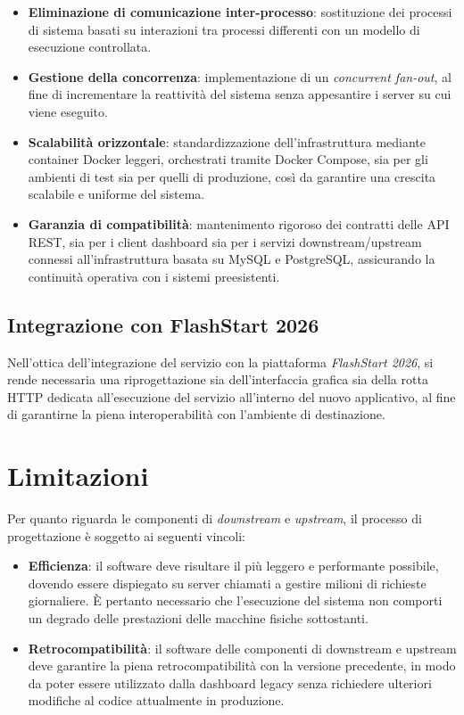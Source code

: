 \begin{itemize}
    \item \textbf{Eliminazione di comunicazione inter-processo}: sostituzione dei processi di sistema basati su interazioni tra processi differenti con un modello di esecuzione controllata.
    
    \item \textbf{Gestione della concorrenza}: implementazione di un \emph{concurrent fan-out}, al fine di incrementare la reattività del sistema senza appesantire i server su cui viene eseguito.

    \item \textbf{Scalabilità orizzontale}: standardizzazione dell'infrastruttura mediante container Docker leggeri, orchestrati tramite Docker Compose, sia per gli ambienti di test sia per quelli di produzione, così da garantire una crescita scalabile e uniforme del sistema.

    \item \textbf{Garanzia di compatibilità}: mantenimento rigoroso dei contratti delle \ac{API} \ac{REST}, sia per i client dashboard sia per i servizi downstream/upstream connessi all'infrastruttura basata su MySQL e PostgreSQL, assicurando la continuità operativa con i sistemi preesistenti.
\end{itemize}

\subsection{Integrazione con FlashStart 2026}
\label{subsec:integrazione-flashstart}

Nell'ottica dell'integrazione del servizio con la piattaforma \emph{FlashStart 2026}, si rende necessaria una riprogettazione sia dell'interfaccia grafica sia della rotta \ac{HTTP} dedicata all'esecuzione del servizio all'interno del nuovo applicativo, al fine di garantirne la piena interoperabilità con l'ambiente di destinazione.

\section{Limitazioni}
\label{sec:limitazioni}
 
Per quanto riguarda le componenti di \emph{downstream} e \emph{upstream}, il processo di progettazione è soggetto ai seguenti vincoli:
 
\begin{itemize}
    \item \textbf{Efficienza}: il software deve risultare il più leggero e performante possibile, dovendo essere dispiegato su server chiamati a gestire milioni di richieste giornaliere. È pertanto necessario che l'esecuzione del sistema non comporti un degrado delle prestazioni delle macchine fisiche sottostanti.
 
    \item \textbf{Retrocompatibilità}: il software delle componenti di downstream e upstream deve garantire la piena retrocompatibilità con la versione precedente, in modo da poter essere utilizzato dalla dashboard legacy senza richiedere ulteriori modifiche al codice attualmente in produzione.
\end{itemize}


